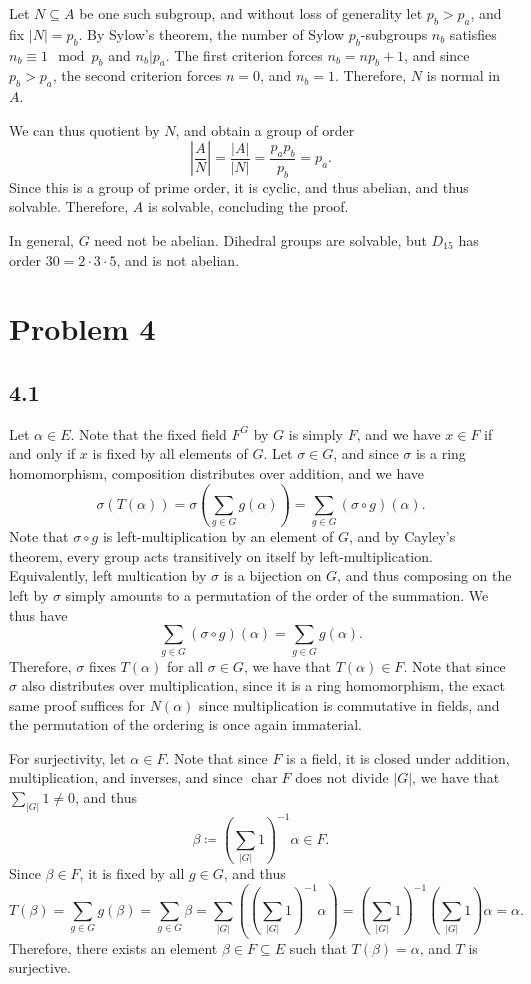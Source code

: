 \documentclass[11pt, letterpaper]{article}
\begin{document}
Let $N\subseteq A$ be one such subgroup, and without loss of generality let $p_b > p_a$, and fix $\left| N \right| =p_b$. By Sylow's theorem, the number of Sylow $p_b$-subgroups $n_b$ satisfies $n_b \equiv 1\mod{p_b}$ and $n_b|p_a$. The first criterion forces $n_b =n p_b + 1$, and since $p_b > p_a$, the second criterion forces $n=0$, and $n_b=1$. Therefore, $N$ is normal in $A$.

We can thus quotient by $N$, and obtain a group of order
\[
	\left| \frac{A}{N}  \right|=\frac{\left| A \right| }{\left| N \right| } =\frac{p_ap_b}{p_b} =p_a
.\]
Since this is a group of prime order, it is cyclic, and thus abelian, and thus solvable. Therefore, $A$ is solvable, concluding the proof.

In general, $G$ need not be abelian. Dihedral groups are solvable, but $D_{15} $ has order $30=2\cdot 3\cdot 5$, and is not abelian.
\section*{Problem 4}
\subsection*{4.1}
Let $\alpha \in E$. Note that the fixed field $F^G$ by $G$ is simply $F$, and we have $x\in F$ if and only if $x$ is fixed by all elements of $G$. Let $\sigma \in G$, and since $\sigma $ is a ring homomorphism, composition distributes over addition, and we have
\[
	\sigma \left( T(\alpha ) \right) =\sigma \left( \sum_{g\in G} g(\alpha ) \right) =\sum_{g\in G} (\sigma \circ g)(\alpha )
.\]
Note that $\sigma \circ g$ is left-multiplication by an element of $G$, and by Cayley's theorem, every group acts transitively on itself by left-multiplication. Equivalently, left multication by $\sigma $ is a bijection on $G$, and thus composing on the left by $\sigma $ simply amounts to a permutation of the order of the summation. We thus have
\[
	\sum_{g\in G} (\sigma \circ g)(\alpha )=\sum_{g\in G} g(\alpha )
.\]
Therefore, $\sigma $ fixes $T(\alpha )$ for all $\sigma \in G$, we have that $T(\alpha )\in F$. Note that since $\sigma $ also distributes over multiplication, since it is a ring homomorphism, the exact same proof suffices for $N(\alpha )$ since multiplication is commutative in fields, and the permutation of the ordering is once again immaterial.

For surjectivity, let $\alpha \in F$. Note that since $F$ is a field, it is closed under addition, multiplication, and inverses, and since $\operatorname{char} F $ does not divide $\left| G \right| $, we have that $\sum_{\left| G \right| } 1\neq 0$, and thus
\[
	\beta \coloneqq \left( \sum_{\left| G \right| } 1 \right) ^{-1} \alpha \in F
.\]
Since $\beta \in F$, it is fixed by all $g\in G$, and thus
\[
	T(\beta )=\sum_{g\in G} g(\beta )=\sum_{g\in G} \beta =\sum_{\left| G \right| } \left( \left(\sum_{\left| G \right| } 1 \right) ^{-1} \alpha\right) =\left( \sum_{\left| G \right| } 1 \right) ^{-1} \left( \sum_{\left| G \right| } 1 \right) \alpha =\alpha 
.\]
Therefore, there exists an element $\beta \in F\subseteq E$ such that $T(\beta )=\alpha $, and $T$ is surjective.
\end{document}
